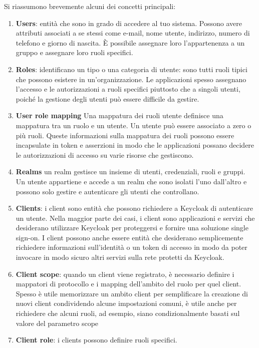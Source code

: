\documentclass{article}
\begin{document}
Si riassumono brevemente alcuni dei concetti principali:

\begin{enumerate}
    \item {\textbf{Users}: entità che sono in grado di accedere al tuo sistema. Possono avere attributi associati a se stessi come e-mail, nome utente, indirizzo, numero di telefono e giorno di nascita. È possibile assegnare loro l'appartenenza a un gruppo e assegnare loro ruoli specifici.}
    \item {\textbf{Roles}: identificano un tipo o una categoria di utente: sono tutti ruoli tipici che possono esistere in un'organizzazione. Le applicazioni spesso assegnano l'accesso e le autorizzazioni a ruoli specifici piuttosto che a singoli utenti, poiché la gestione degli utenti può essere difficile da gestire. }
    \item {\textbf{User role mapping} Una mappatura dei ruoli utente definisce una mappatura tra un ruolo e un utente. Un utente può essere associato a zero o più ruoli. Queste informazioni sulla mappatura dei ruoli possono essere incapsulate in token e asserzioni in modo che le applicazioni possano decidere le autorizzazioni di accesso su varie risorse che gestiscono.}
    \item {\textbf{Realms} un realm gestisce un insieme di utenti, credenziali, ruoli e gruppi. Un utente appartiene e accede a un realm che sono isolati l'uno dall'altro e possono solo gestire e autenticare gli utenti che controllano.}
    \item {\textbf{Clients}: i client sono entità che possono richiedere a Keycloak di autenticare un utente. Nella maggior parte dei casi, i client sono applicazioni e servizi che desiderano utilizzare Keycloak per proteggersi e fornire una soluzione single sign-on. I client possono anche essere entità che desiderano semplicemente richiedere informazioni sull'identità o un token di accesso in modo da poter invocare in modo sicuro altri servizi sulla rete protetti da Keycloak.}
    \item {\textbf{Client scope}: quando un client viene registrato, è necessario definire i mappatori di protocollo e i mapping dell'ambito del ruolo per quel client. Spesso è utile memorizzare un ambito client per semplificare la creazione di nuovi client condividendo alcune impostazioni comuni, è utile anche per richiedere che alcuni ruoli, ad esempio, siano condizionalmente basati sul valore del parametro scope}
    \item {\textbf{Client role}: i clients possono definire ruoli specifici.}
\end{enumerate}
\end{document}
